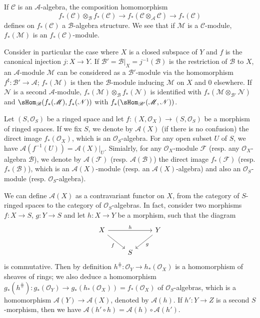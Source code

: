 If $\mathscr{C}$ is an $\mathscr{A}$-algebra, the composition homomorphism
\[f_*(\mathscr{C})\otimes_{\mathscr{B}}f_*(\mathscr{C})\to f_*(\mathscr{C}\otimes_{\mathscr{A}}\mathscr{C})\to f_*(\mathscr{C})\]
defines on $f_*(\mathscr{C})$ a $\mathscr{B}$-algebra structure. We see that if $\mathscr{M}$ is a $\mathscr{C}$-module, $f_*(\mathscr{M})$ is an $f_*(\mathscr{C})$-module.\par
Consider in particular the case where $X$ is a closed subspace of $Y$ and $f$ is the canonical injection $j:X\to Y$. If $\mathscr{B}'=\mathscr{B}|_X=j^{-1}(\mathscr{B})$ is the restriction of $\mathscr{B}$ to $X$, an $\mathscr{A}$-module $\mathscr{M}$ can be considered as a $\mathscr{B}'$-module via the homomorphism $f^{\sharp}:\mathscr{B}'\to\mathscr{A}$; $f_*(\mathscr{M})$ is then the $\mathscr{B}$-module inducing $\mathscr{M}$ on $X$ and $0$ elsewhere. If $\mathscr{N}$ is a second $\mathscr{A}$-module, $f_*(\mathscr{M})\otimes_{\mathscr{B}}f_*(\mathscr{N})$ is identified with $f_*(\mathscr{M}\otimes_{\mathscr{B}'}\mathscr{N})$ and $\sHom_{\mathscr{B}}(f_*(\mathscr{M}),f_*(\mathscr{N}))$ with $f_*(\sHom_{\mathscr{B}'}(\mathscr{M},\mathscr{N}))$.\par
Let $(S,\mathscr{O}_S)$ be a ringed space and let $f:(X,\mathscr{O}_X)\to(S,\mathscr{O}_S)$ be a morphism of ringed spaces. If we fix $S$, we denote by $\mathscr{A}(X)$ (if there is no confusion) the direct image $f_*(\mathscr{O}_X)$, which is an $\mathscr{O}_S$-algebra. For any open subset $U$ of $S$, we have $\mathscr{A}(f^{-1}(U))=\mathscr{A}(X)|_U$. Simialrly, for any $\mathscr{O}_X$-module $\mathscr{F}$ (resp. any $\mathscr{O}_X$-algebra $\mathscr{B}$), we denote by $\mathscr{A}(\mathscr{F})$ (resp. $\mathscr{A}(\mathscr{B})$) the direct image $f_*(\mathscr{F})$ (resp. $f_*(\mathscr{B})$), which is an $\mathscr{A}(X)$-module (resp. an $\mathscr{A}(X)$-algebra) and also an $\mathscr{O}_S$-module (resp. $\mathscr{O}_S$-algebra).\par
We can define $\mathscr{A}(X)$ as a contravariant functor on $X$, from the category of $S$-ringed spaces to the category of $\mathscr{O}_S$-algebras. In fact, consider two morphisms $f:X\to S$, $g:Y\to S$ and let $h:X\to Y$ be a morphism, such that the diagram
\[\begin{tikzcd}
X\ar[rd,swap,"f"]\ar[rr,"h"]&&Y\ar[ld,"g"]\\
&S
\end{tikzcd}\]
is commutative. Then by definition $h^{\hash}:\mathscr{O}_Y\to h_*(\mathscr{O}_X)$ is a homomorphism of sheaves of rings; we also deduce a homomorphism $g_*(h^{\hash}):g_*(\mathscr{O}_Y)\to g_*(h_*(\mathscr{O}_X))=f_*(\mathscr{O}_X)$ of $\mathscr{O}_S$-algebras, which is a homomorphism $\mathscr{A}(Y)\to\mathscr{A}(X)$, denoted by $\mathscr{A}(h)$. If $h':Y\to Z$ is a second $S$-morphism, then we have $\mathscr{A}(h'\circ h)=\mathscr{A}(h)\circ\mathscr{A}(h')$.\par
